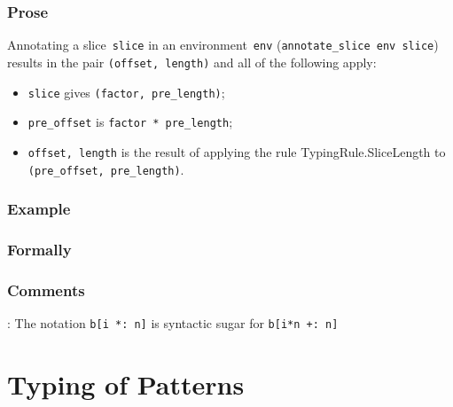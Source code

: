 \documentclass{book}
\begin{document}
\begin{itemize}
  \subsection{Prose}
      Annotating a slice~\texttt{slice} in an environment~\texttt{env}
(\texttt{annotate\_slice env slice}) results in the pair \texttt{(offset,
length)} and all of the following apply:
   \begin{itemize}
   \item \texttt{slice} gives \texttt{(factor, pre\_length)};
   \item \texttt{pre\_offset} is \texttt{factor * pre\_length};
   \item \texttt{offset, length} is the result of applying the rule TypingRule.SliceLength to \texttt{(pre\_offset, pre\_length)}.
   \end{itemize}

  \subsection{Example}



\begin{emptyformal}
    \subsection{Formally}
\end{emptyformal}

\subsection{Comments}
    : The notation \texttt{b[i *: n]} is syntactic sugar for \texttt{b[i*n +: n]}

\chapter{Typing of Patterns}


\end{itemize}
\end{document}
